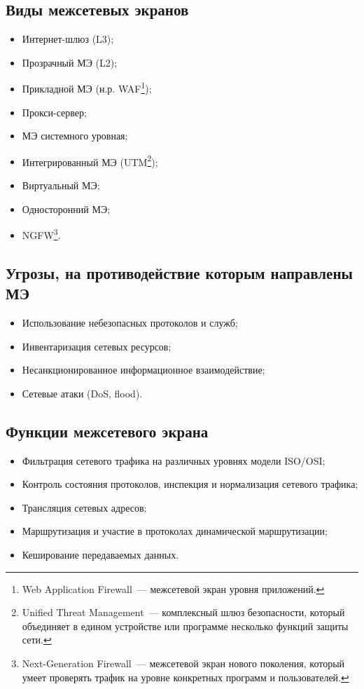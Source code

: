 	\subsection*{Виды межсетевых экранов}
	
	\begin{itemize}
		\item Интернет-шлюз (L3);
		\item Прозрачный МЭ (L2);
		\item Прикладной МЭ (н.р. WAF\footnote{Web Application Firewall~--- межсетевой экран уровня приложений.});
		\item Прокси-сервер;
		\item МЭ системного уровная;
		\item Интегрированный МЭ (UTM\footnote{Unified Threat Management~--- комплексный шлюз безопасности, который объединяет в едином устройстве или программе несколько функций защиты сети.});
		\item Виртуальный МЭ;
		\item Односторонний МЭ;
		\item NGFW\footnote{Next-Generation Firewall~--- межсетевой экран нового поколения, который умеет проверять трафик на уровне конкретных программ и пользователей.}.
		\end{itemize}
	
	\subsection*{Угрозы, на противодействие которым направлены МЭ}
	
	\begin{itemize}
		\item Использование небезопасных протоколов и служб;
		\item Инвентаризация сетевых ресурсов;
		\item Несанкционированное информационное взаимодействие;
		\item Сетевые атаки (DoS, flood).
	\end{itemize}
	
	\subsection*{Функции межсетевого экрана}
	
	\begin{itemize}
		\item Фильтрация сетевого трафика на различных уровнях модели ISO/OSI;
		\item Контроль состояния протоколов, инспекция и нормализация сетевого трафика;
		\item Трансляция сетевых адресов;
		\item Маршрутизация и участие в протоколах динамической маршрутизации;
		\item Кеширование передаваемых данных.
	\end{itemize}
	
